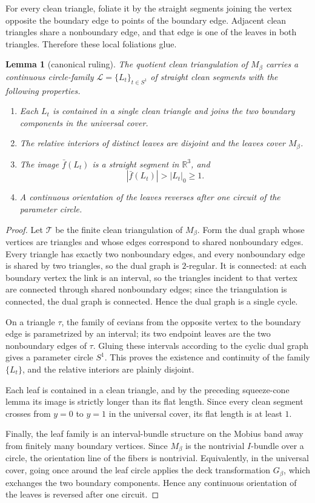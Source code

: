 \documentclass[12pt]{article}
\newtheorem{lemma}[theorem]{Lemma}
\newcommand{\R}{\mathbb R}
\begin{document}
For every clean triangle, foliate it by the straight segments joining the vertex opposite the boundary edge to points of the boundary edge.  Adjacent clean triangles share a nonboundary edge, and that edge is one of the leaves in both triangles.  Therefore these local foliations glue.

\begin{lemma}[canonical ruling]
The quotient clean triangulation of \(M_\beta\) carries a continuous circle-family \(\mathcal L=\{L_t\}_{t\in S^1}\) of straight clean segments with the following properties.
\begin{enumerate}[label=\textup{(\roman*)}]
\item Each \(L_t\) is contained in a single clean triangle and joins the two boundary components in the universal cover.
\item The relative interiors of distinct leaves are disjoint and the leaves cover \(M_\beta\).
\item The image \(\bar f(L_t)\) is a straight segment in \(\R^3\), and
\[
|\bar f(L_t)|>|L_t|_0\ge 1.
\]
\item A continuous orientation of the leaves reverses after one circuit of the parameter circle.
\end{enumerate}
\end{lemma}

\begin{proof}
Let \(\mathcal T\) be the finite clean triangulation of \(M_\beta\).  Form the dual graph whose vertices are triangles and whose edges correspond to shared nonboundary edges.  Every triangle has exactly two nonboundary edges, and every nonboundary edge is shared by two triangles, so the dual graph is \(2\)-regular.  It is connected: at each boundary vertex the link is an interval, so the triangles incident to that vertex are connected through shared nonboundary edges; since the triangulation is connected, the dual graph is connected.  Hence the dual graph is a single cycle.

On a triangle \(\tau\), the family of cevians from the opposite vertex to the boundary edge is parametrized by an interval; its two endpoint leaves are the two nonboundary edges of \(\tau\).  Gluing these intervals according to the cyclic dual graph gives a parameter circle \(S^1\).  This proves the existence and continuity of the family \(\{L_t\}\), and the relative interiors are plainly disjoint.

Each leaf is contained in a clean triangle, and by the preceding squeeze-cone lemma its image is strictly longer than its flat length.  Since every clean segment crosses from \(y=0\) to \(y=1\) in the universal cover, its flat length is at least \(1\).

Finally, the leaf family is an interval-bundle structure on the Mobius band away from finitely many boundary vertices.  Since \(M_\beta\) is the nontrivial \(I\)-bundle over a circle, the orientation line of the fibers is nontrivial.  Equivalently, in the universal cover, going once around the leaf circle applies the deck transformation \(G_\beta\), which exchanges the two boundary components.  Hence any continuous orientation of the leaves is reversed after one circuit.
\end{proof}
\end{document}
